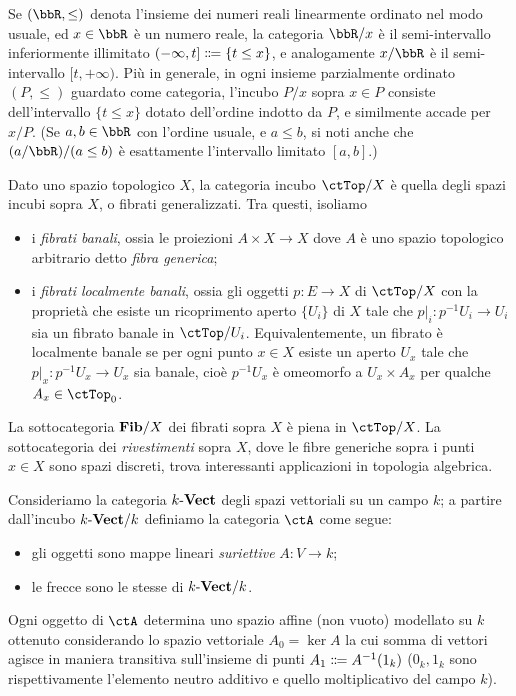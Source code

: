 \begin{example}[Intervalli]\label{ex_pos_slices}
 Se \((\bbR,\le)\) denota l'insieme dei numeri reali linearmente ordinato nel modo usuale, ed \(x\in\bbR\) è un numero reale, la categoria \(\bbR/x\) è il semi-intervallo inferiormente illimitato \((-\infty,t]\defeq \{t\le x\}\), e analogamente \(x/\bbR\) è il semi-intervallo \([t,+\infty)\). Più in generale, in ogni insieme parzialmente ordinato \((P,\le)\) guardato come categoria, l'incubo \(P/x\) sopra \(x\in P\) consiste dell'intervallo \(\{t\le x\}\) dotato dell'ordine indotto da \(P\), e similmente accade per \(x/P\). (Se \(a,b\in\bbR\) con l'ordine usuale, e \(a\le b\), si noti anche che \((a/\bbR)/(a\le b)\) è esattamente l'intervallo limitato \([a,b]\).)
\end{example}
\begin{example}\label{ex_fibrati_rivestimenti}
 Dato uno spazio topologico \(X\), la categoria incubo \(\ctTop/X\) è quella degli spazi incubi sopra \(X\), o fibrati generalizzati. Tra questi, isoliamo
 \begin{itemize}
  \item i \emph{fibrati banali}, ossia le proiezioni \(A\times X \to X\) dove \(A\) è uno spazio topologico arbitrario detto \emph{fibra generica};
  \item i \emph{fibrati localmente banali}, ossia gli oggetti \(p \colon E\to X\) di \(\ctTop/X\) con la proprietà che esiste un ricoprimento aperto \(\{U_i\}\) di \(X\) tale che \(p|_i \colon p^{-1}U_i\to U_i\) sia un fibrato banale in \(\ctTop/U_i\). Equivalentemente, un fibrato è localmente banale se per ogni punto \(x\in X\) esiste un aperto \(U_x\) tale che \(p|_x \colon p^{-1}U_x\to U_x\) sia banale, cioè \(p^{-1}U_x\) è omeomorfo a \(U_x\times A_x\) per qualche \(A_x\in\ctTop_0\).
 \end{itemize}
 La sottocategoria \(\mathbf{Fib}/X\) dei fibrati sopra \(X\) è piena in \(\ctTop/X\). La sottocategoria dei \emph{rivestimenti} sopra \(X\), dove le fibre generiche sopra i punti \(x\in X\) sono spazi discreti, trova interessanti applicazioni in topologia algebrica.
\end{example}
\begin{example}\label{ex_affini}
 Consideriamo la categoria \(\ctVect[k]\) degli spazi vettoriali su un campo \(k\); a partire dall'incubo \(\ctVect[k]/k\) definiamo la categoria \(\ctA\) come segue:
 \begin{itemize}
  \item gli oggetti sono mappe lineari \emph{suriettive} \(A \colon V\to k\);
  \item le frecce sono le stesse di \(\ctVect[k]/k\).
 \end{itemize}
 Ogni oggetto di \(\ctA\) determina uno spazio affine (non vuoto) modellato su \(k\) ottenuto considerando lo spazio vettoriale \(A_0 = \ker A\) la cui somma di vettori agisce in maniera transitiva sull'insieme di punti \(A_1 \defeq  A^{-1}(1_k)\) (\(0_k,1_k\) sono rispettivamente l'elemento neutro additivo e quello moltiplicativo del campo \(k\)).
\end{example}
